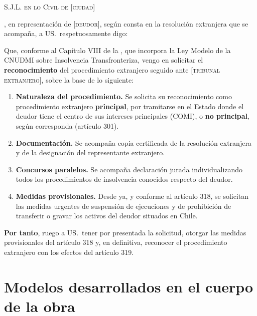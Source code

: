 \begin{escrito}
\small
\noindent\textsc{S.J.L. en lo Civil de} [\textsc{ciudad}]

\medskip
{}, en representación de [\textsc{deudor}], según
consta en la resolución extranjera que se acompaña, a US.\ respetuosamente digo:

\medskip
Que, conforme al Capítulo VIII de la \LIR{}, que incorpora la Ley Modelo de la CNUDMI sobre
Insolvencia Transfronteriza, vengo en solicitar el \textbf{reconocimiento} del procedimiento
extranjero seguido ante [\textsc{tribunal extranjero}], sobre la base de lo siguiente:

\begin{enumerate}[leftmargin=1.6em]
  \item \textbf{Naturaleza del procedimiento.} Se solicita su reconocimiento como
  procedimiento extranjero \textbf{principal}, por tramitarse en el Estado donde el deudor
  tiene el centro de sus intereses principales (COMI), o \textbf{no principal}, según
  corresponda (artículo 301).
  \item \textbf{Documentación.} Se acompaña copia certificada de la resolución extranjera y
  de la designación del representante extranjero.
  \item \textbf{Concursos paralelos.} Se acompaña declaración jurada individualizando todos
  los procedimientos de insolvencia conocidos respecto del deudor.
  \item \textbf{Medidas provisionales.} Desde ya, y conforme al artículo 318, se solicitan
  las medidas urgentes de suspensión de ejecuciones y de prohibición de transferir o gravar
  los activos del deudor situados en Chile.
\end{enumerate}

\medskip
\noindent\textbf{Por tanto}, ruego a US.\ tener por presentada la solicitud, otorgar las
medidas provisionales del artículo 318 y, en definitiva, reconocer el procedimiento
extranjero con los efectos del artículo 319.
\end{escrito}

\section{Modelos desarrollados en el cuerpo de la obra}

